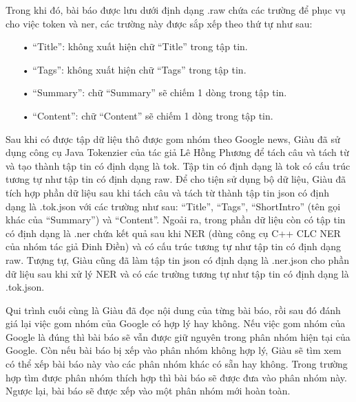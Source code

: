 Trong khi đó, bài báo được lưu dưới định dạng .raw chứa các trường để phục vụ cho việc token và ner, các trường này được sắp xếp theo thứ tự như sau:
\begin{enumerate}
\item[•]``Title'': không xuất hiện chữ ``Title'' trong tập tin.
\item[•]``Tags'': không xuất hiện chữ ``Tags'' trong tập tin.
\item[•]``Summary'': chữ ``Summary'' sẽ chiếm 1 dòng trong tập tin.
\item[•]``Content'': chữ ``Content'' sẽ chiếm 1 dòng trong tập tin.
\end{enumerate}

Sau khi có được tập dữ liệu thô được gom nhóm theo Google news, Giàu đã sử dụng công cụ Java Tokenzier của tác giả Lê Hồng Phương để tách câu và tách từ và tạo thành tập tin có định dạng là tok.
Tập tin có định dạng là tok có cấu trúc tương tự như tập tin có định dạng raw.
Để cho tiện sử dụng bộ dữ liệu, Giàu đã tích hợp phần dữ liệu sau khi tách câu và tách từ thành tập tin json có định dạng là .tok.json với các trường như sau: ``Title'', ``Tags'',  ``ShortIntro'' (tên gọi khác của ``Summary'') và ``Content''.
Ngoải ra, trong phần dữ liệu còn có tập tin có định dạng là .ner chứa kết quả sau khi NER (dùng công cụ C++ CLC NER của nhóm tác giả Đinh Điền) và có cấu trúc tương tự như tập tin có định dạng raw.
Tượng tự, Giàu cũng đã làm tập tin json có định dạng là .ner.json cho phần dữ liệu sau khi xử lý NER và có các trường tương tự như tập tin có định dạng là .tok.json.

Qui trình cuối cùng là Giàu đã đọc nội dung của từng bài báo, rồi sau đó đánh giá lại việc gom nhóm của Google có hợp lý hay không.
Nếu việc gom nhóm của Google là đúng thì bài báo sẽ vẫn được giữ nguyên trong phân nhóm hiện tại của Google.
Còn nếu bài báo bị xếp vào phân nhóm không hợp lý, Giàu sẽ tìm xem có thể xếp bài báo này vào các phân nhóm khác có sẵn hay không.
Trong trường hợp tìm được phân nhóm thích hợp thì bài báo sẽ được đưa vào phân nhóm này.
Ngược lại, bài báo sẽ được xếp vào một phân nhóm mới hoàn toàn.

	


